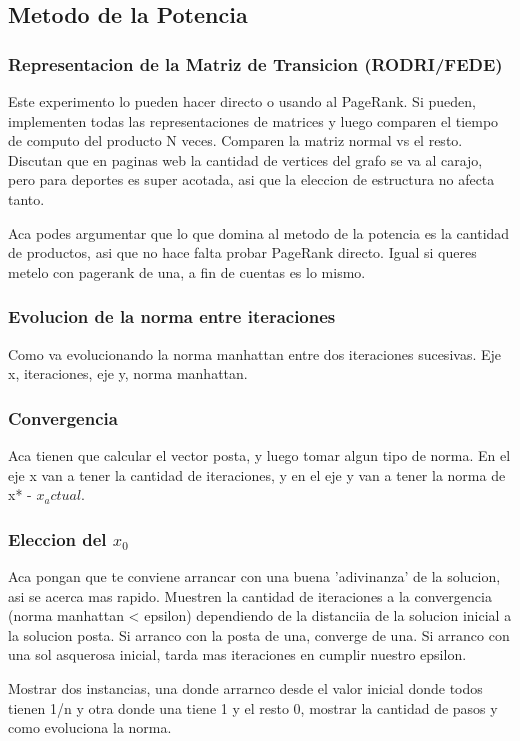 \subsection{Metodo de la Potencia}

\subsubsection{Representacion de la Matriz de Transicion (RODRI/FEDE)}
Este experimento lo pueden hacer directo o usando al PageRank. Si pueden, implementen todas las representaciones de matrices y luego comparen el tiempo de computo del producto N veces. Comparen la matriz normal vs el resto. Discutan que en paginas web la cantidad de vertices del grafo se va al carajo, pero para deportes es super acotada, asi que la eleccion de estructura no afecta tanto.

Aca podes argumentar que lo que domina al metodo de la potencia es la cantidad de productos, asi que no hace falta probar PageRank directo. Igual si queres metelo con pagerank de una, a fin de cuentas es lo mismo.

\subsubsection{Evolucion de la norma entre iteraciones}
Como va evolucionando la norma manhattan entre dos iteraciones sucesivas. Eje x, iteraciones, eje y, norma manhattan.

\subsubsection{Convergencia}
Aca tienen que calcular el vector posta, y luego tomar algun tipo de norma. En el eje x van a tener la cantidad de iteraciones, y en el eje y van a tener la norma de x* - $x_actual$.

\subsubsection{Eleccion del $x_0$}

Aca pongan que te conviene arrancar con una buena 'adivinanza' de la solucion, asi se acerca mas rapido. Muestren la cantidad de iteraciones a la convergencia (norma manhattan < epsilon) dependiendo de la distanciia de la solucion inicial a la solucion posta. Si arranco con la posta de una, converge de una. Si arranco con una sol asquerosa inicial, tarda mas iteraciones en cumplir nuestro epsilon.

Mostrar dos instancias, una donde arrarnco desde el valor inicial donde todos tienen 1/n y otra donde una tiene 1 y el resto 0, mostrar la cantidad de pasos y como evoluciona la norma.


